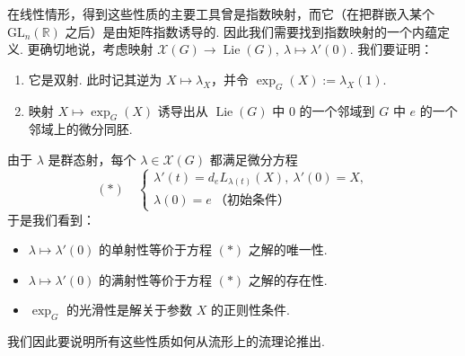 \begin{numpara}[微分方程]\label{np:lie-1-7-2}
在线性情形，得到这些性质的主要工具曾是指数映射，而它（在把群嵌入某个 $\mathrm{GL}_{n}(\mathbb R)$ 之后）是由矩阵指数诱导的. 因此我们需要找到指数映射的一个内蕴定义. 更确切地说，考虑映射 $\mathscr X(G)\longrightarrow\operatorname{Lie}(G),\ \lambda\mapsto\lambda'(0)$. 我们要证明：
\begin{enumerate}[label=\roman*)]
\item 它是双射. 此时记其逆为 $X\mapsto\lambda_{X}$，并令 $\exp_{G}(X):=\lambda_{X}(1)$.
\item 映射 $X\mapsto\exp_{G}(X)$ 诱导出从 $\operatorname{Lie}(G)$ 中 $0$ 的一个邻域到 $G$ 中 $e$ 的一个邻域上的微分同胚.
\end{enumerate}
由于 $\lambda$ 是群态射，每个 $\lambda\in\mathscr X(G)$ 都满足微分方程
\[
(*)\quad
\begin{cases}
\lambda'(t)=d_{e}L_{\lambda(t)}(X),\ \lambda'(0)=X,\\
\lambda(0)=e\ \text{（初始条件）}
\end{cases}
\]
于是我们看到：
\begin{itemize}[label=--]
\item $\lambda\mapsto\lambda'(0)$ 的单射性等价于方程 $(*)$ 之解的唯一性.
\item $\lambda\mapsto\lambda'(0)$ 的满射性等价于方程 $(*)$ 之解的存在性.
\item $\exp_{G}$ 的光滑性是解关于参数 $X$ 的正则性条件.
\end{itemize}
我们因此要说明所有这些性质如何从流形上的流理论推出.
\end{numpara}

